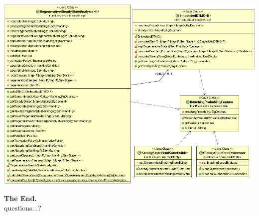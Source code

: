 \begin{frame}
  \begin{center}
    \includegraphics[width=\textwidth]{img/uml.png}
  \end{center}
\end{frame}

\begin{frame}
  \begin{center}
	\textbf{\Huge The End.}\\[3cm]
	\pause
	{\huge questions...?}
  \end{center}
\end{frame}
